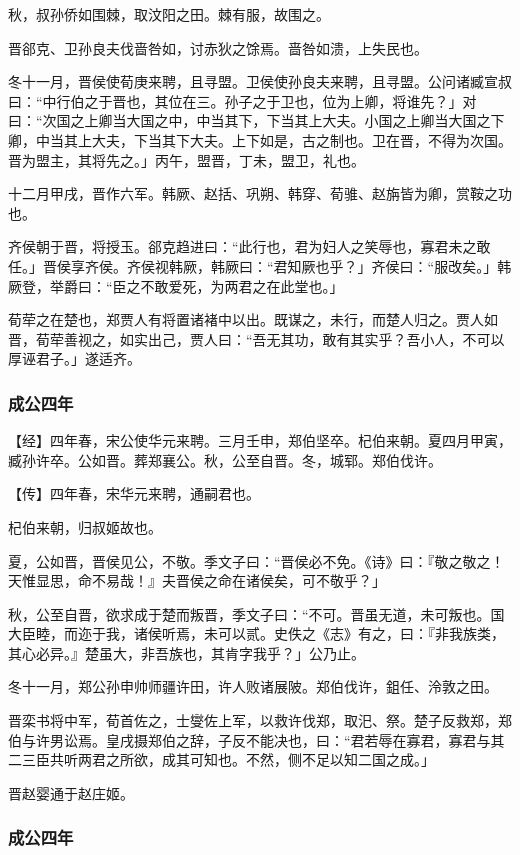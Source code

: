 \documentclass[]{article}
\begin{document}
秋，叔孙侨如围棘，取汶阳之田。棘有服，故围之。

晋郤克、卫孙良夫伐啬咎如，讨赤狄之馀焉。啬咎如溃，上失民也。

冬十一月，晋侯使荀庚来聘，且寻盟。卫侯使孙良夫来聘，且寻盟。公问诸臧宣叔曰：``中行伯之于晋也，其位在三。孙子之于卫也，位为上卿，将谁先？」对曰：``次国之上卿当大国之中，中当其下，下当其上大夫。小国之上卿当大国之下卿，中当其上大夫，下当其下大夫。上下如是，古之制也。卫在晋，不得为次国。晋为盟主，其将先之。」丙午，盟晋，丁未，盟卫，礼也。

十二月甲戌，晋作六军。韩厥、赵括、巩朔、韩穿、荀骓、赵旃皆为卿，赏鞍之功也。

齐侯朝于晋，将授玉。郤克趋进曰：``此行也，君为妇人之笑辱也，寡君未之敢任。」晋侯享齐侯。齐侯视韩厥，韩厥曰：``君知厥也乎？」齐侯曰：``服改矣。」韩厥登，举爵曰：``臣之不敢爱死，为两君之在此堂也。」

荀荦之在楚也，郑贾人有将置诸褚中以出。既谋之，未行，而楚人归之。贾人如晋，荀荦善视之，如实出己，贾人曰：``吾无其功，敢有其实乎？吾小人，不可以厚诬君子。」遂适齐。

\hypertarget{header-n1562}{%
\subsubsection{成公四年}\label{header-n1562}}

【经】四年春，宋公使华元来聘。三月壬申，郑伯坚卒。杞伯来朝。夏四月甲寅，臧孙许卒。公如晋。葬郑襄公。秋，公至自晋。冬，城郓。郑伯伐许。

【传】四年春，宋华元来聘，通嗣君也。

杞伯来朝，归叔姬故也。

夏，公如晋，晋侯见公，不敬。季文子曰：``晋侯必不免。《诗》曰：『敬之敬之！天惟显思，命不易哉！』夫晋侯之命在诸侯矣，可不敬乎？」

秋，公至自晋，欲求成于楚而叛晋，季文子曰：``不可。晋虽无道，未可叛也。国大臣睦，而迩于我，诸侯听焉，未可以贰。史佚之《志》有之，曰：『非我族类，其心必异。』楚虽大，非吾族也，其肯字我乎？」公乃止。

冬十一月，郑公孙申帅师疆许田，许人败诸展陂。郑伯伐许，鉏任、泠敦之田。

晋栾书将中军，荀首佐之，士燮佐上军，以救许伐郑，取汜、祭。楚子反救郑，郑伯与许男讼焉。皇戌摄郑伯之辞，子反不能决也，曰：``君若辱在寡君，寡君与其二三臣共听两君之所欲，成其可知也。不然，侧不足以知二国之成。」

晋赵婴通于赵庄姬。

\hypertarget{header-n1573}{%
\subsubsection{成公四年}\label{header-n1573}}
\end{document}
